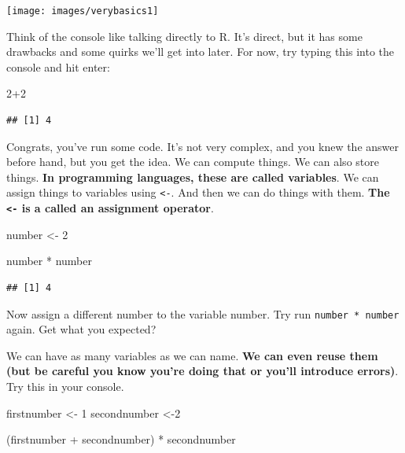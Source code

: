 \documentclass[
]{book}
\newenvironment{Shaded}{\begin{snugshade}}{\end{snugshade}}
\newcommand{\DecValTok}[1]{\textcolor[rgb]{0.00,0.00,0.81}{#1}}
\newcommand{\NormalTok}[1]{#1}
\newcommand{\OtherTok}[1]{\textcolor[rgb]{0.56,0.35,0.01}{#1}}
\newcommand{\SpecialCharTok}[1]{\textcolor[rgb]{0.00,0.00,0.00}{#1}}
\begin{document}
\texttt{[image: images/verybasics1]}

Think of the console like talking directly to R. It's direct, but it has some drawbacks and some quirks we'll get into later. For now, try typing this into the console and hit enter:

\begin{Shaded}
\begin{Highlighting}[]
\DecValTok{2}\SpecialCharTok{+}\DecValTok{2}
\end{Highlighting}
\end{Shaded}

\begin{verbatim}
## [1] 4
\end{verbatim}

Congrats, you've run some code. It's not very complex, and you knew the answer before hand, but you get the idea. We can compute things. We can also store things. \textbf{In programming languages, these are called variables}. We can assign things to variables using \texttt{\textless{}-}. And then we can do things with them. \textbf{The \texttt{\textless{}-} is a called an assignment operator}.

\begin{Shaded}
\begin{Highlighting}[]
\NormalTok{number }\OtherTok{\textless{}{-}} \DecValTok{2}

\NormalTok{number }\SpecialCharTok{*}\NormalTok{ number}
\end{Highlighting}
\end{Shaded}

\begin{verbatim}
## [1] 4
\end{verbatim}

Now assign a different number to the variable number. Try run \texttt{number\ *\ number} again. Get what you expected?

We can have as many variables as we can name. \textbf{We can even reuse them (but be careful you know you're doing that or you'll introduce errors)}. Try this in your console.

\begin{Shaded}
\begin{Highlighting}[]
\NormalTok{firstnumber }\OtherTok{\textless{}{-}} \DecValTok{1}
\NormalTok{secondnumber }\OtherTok{\textless{}{-}}\DecValTok{2} 

\NormalTok{(firstnumber }\SpecialCharTok{+}\NormalTok{ secondnumber) }\SpecialCharTok{*}\NormalTok{ secondnumber}
\end{Highlighting}
\end{Shaded}
\end{document}
